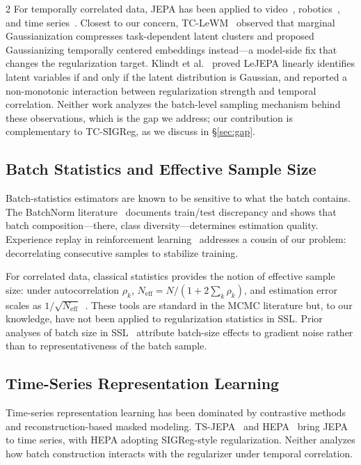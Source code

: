 \documentclass[10pt]{article}
\theoremstyle{remark}
\begin{document}
\begin{multicols*}{2}
For temporally correlated data, JEPA has been applied to video~\cite{bardes2024vjepa}, robotics~\cite{maes2026lewm}, and time series~\cite{tsjepa2025,petersen2026hepa}. Closest to our concern, TC-LeWM~\cite{liu2026tclwm} observed that marginal Gaussianization compresses task-dependent latent clusters and proposed Gaussianizing temporally centered embeddings instead---a model-side fix that changes the regularization target. Klindt et al.~\cite{klindt2026lejepa} proved LeJEPA linearly identifies latent variables if and only if the latent distribution is Gaussian, and reported a non-monotonic interaction between regularization strength and temporal correlation. Neither work analyzes the batch-level sampling mechanism behind these observations, which is the gap we address; our contribution is complementary to TC-SIGReg, as we discuss in \S\ref{sec:gap}.

\subsection{Batch Statistics and Effective Sample Size}

Batch-statistics estimators are known to be sensitive to what the batch contains. The BatchNorm literature~\cite{singh2019evalnorm,unravelingbn2023} documents train/test discrepancy and shows that batch composition---there, class diversity---determines estimation quality. Experience replay in reinforcement learning~\cite{lin1992replay,mnih2015dqn,schaul2016prioritized} addresses a cousin of our problem: decorrelating consecutive samples to stabilize training.

For correlated data, classical statistics provides the notion of effective sample size: under autocorrelation $\rho_k$, $N_{\mathrm{eff}} = N/(1+2\sum_k \rho_k)$, and estimation error scales as $1/\sqrt{N_{\mathrm{eff}}}$~\cite{geyer1992mcmc,flegal2010batchmeans,stan2023ess}. These tools are standard in the MCMC literature but, to our knowledge, have not been applied to regularization statistics in SSL. Prior analyses of batch size in SSL~\cite{vaessen2024batchsize} attribute batch-size effects to gradient noise rather than to representativeness of the batch sample.

\subsection{Time-Series Representation Learning}

Time-series representation learning has been dominated by contrastive methods~\cite{yue2022ts2vec} and reconstruction-based masked modeling. TS-JEPA~\cite{tsjepa2025} and HEPA~\cite{petersen2026hepa} bring JEPA to time series, with HEPA adopting SIGReg-style regularization. Neither analyzes how batch construction interacts with the regularizer under temporal correlation.


\end{multicols*}
\end{document}
